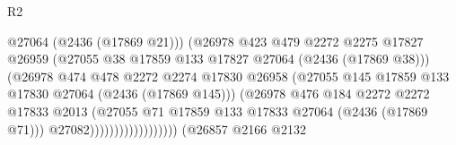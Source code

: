 \begin{lexlean}{R2}
\begin{coremodule}
                                              @27064
                                              (@2436 (@17869 @21)))
                                            (@26978
                                              @423
                                              @479
                                              @2272
                                              @2275
                                              @17827
                                              @26959
                                              (@27055
                                                @38
                                                @17859
                                                @133
                                                @17827
                                                @27064
                                                (@2436 (@17869 @38)))
                                              (@26978
                                                @474
                                                @478
                                                @2272
                                                @2274
                                                @17830
                                                @26958
                                                (@27055
                                                  @145
                                                  @17859
                                                  @133
                                                  @17830
                                                  @27064
                                                  (@2436 (@17869 @145)))
                                                (@26978
                                                  @476
                                                  @184
                                                  @2272
                                                  @2272
                                                  @17833
                                                  @2013
                                                  (@27055
                                                    @71
                                                    @17859
                                                    @133
                                                    @17833
                                                    @27064
                                                    (@2436 (@17869 @71)))
                                                  @27082))))))))))))))))))
              (@26857
                @2166
                @2132

\end{coremodule}
\end{lexlean}
